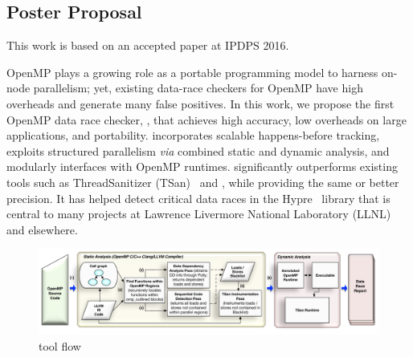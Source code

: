 \documentclass[svgnames,10pt]{article}
\begin{document}
\vspace{-10pt}
\subsection{Poster Proposal}
\vspace{-6pt}
This work is based on an accepted paper at IPDPS 2016.



OpenMP plays a growing role as a portable programming model to harness
on-node parallelism; yet, existing data-race checkers for OpenMP have high
overheads and generate many false positives.
% 
In this work, we propose the first OpenMP data race checker, \archer, that
achieves high accuracy, low overheads on large applications, and
portability.
% 
\archer incorporates scalable happens-before tracking, exploits structured
parallelism \textit{via} combined static and dynamic analysis, and modularly
interfaces with OpenMP runtimes.
% 
\archer significantly outperforms existing tools such as
ThreadSanitizer (TSan)~\cite{tsan:2009,tsan} and \insp, while providing the same or
better precision.
% 
It has helped detect critical data races in the Hypre~\cite{hypre} library
that is central to many projects at Lawrence Livermore National Laboratory
(LLNL) and elsewhere.

\begin{figure}
  \includegraphics[width=\textwidth]{archerdiagram}
  \vspace{-20pt}
  \caption{\archer tool flow}
  \label{fig:archerdiagram}
  \vspace{-5pt}
\end{figure}
\end{document}

